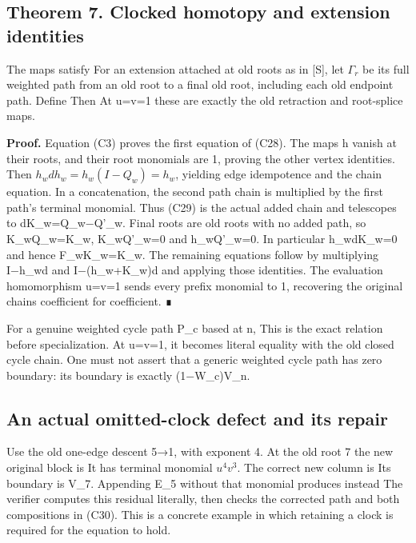 \subsection{Theorem 7. Clocked homotopy and extension identities}

The maps satisfy
 For an extension attached
at old roots as in {[}S{]}, let \(\Gamma_r\) be its full weighted path
from an old root to a final old root, including each old endpoint path.
Define 
Then  At u=v=1 these are exactly the old
retraction and root-splice maps.

\textbf{Proof.} Equation (C3) proves the first equation of (C28). The
maps h vanish at their roots, and their root monomials are 1, proving
the other vertex identities. Then \(h_wdh_w=h_w(I-Q_w)=h_w\), yielding
edge idempotence and the chain equation. In a concatenation, the second
path chain is multiplied by the first path's terminal monomial. Thus
(C29) is the actual added chain and telescopes to dK\_w=Q\_w−Q'\_w.
Final roots are old roots with no added path, so K\_wQ\_w=K\_w,
K\_wQ'\_w=0 and h\_wQ'\_w=0. In particular h\_wdK\_w=0 and hence
F\_wK\_w=K\_w. The remaining equations follow by multiplying I−h\_wd and
I−(h\_w+K\_w)d and applying those identities. The evaluation
homomorphism u=v=1 sends every prefix monomial to 1, recovering the
original chains coefficient for coefficient. ∎

For a genuine weighted cycle path P\_c based at n,
 This is the exact relation
before specialization. At u=v=1, it becomes literal equality with the
old closed cycle chain. One must not assert that a generic weighted
cycle path has zero boundary: its boundary is exactly (1−W\_c)V\_n.

\subsection{An actual omitted-clock defect and its repair}

Use the old one-edge descent 5→1, with exponent 4. At the old root 7 the
new original block is
It has terminal monomial \(u^4v^3\). The correct new column is
 Its boundary is V\_7. Appending
E\_5 without that monomial produces instead
 The verifier computes this residual
literally, then checks the corrected path and both compositions in
(C30). This is a concrete example in which retaining a clock is required
for the equation to hold.

